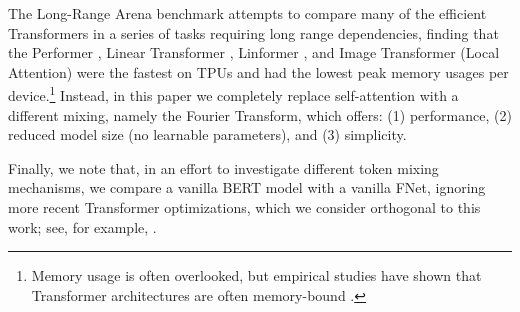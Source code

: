 The Long-Range Arena benchmark \citep{tay2020long} attempts to compare many of the efficient Transformers in a series of tasks requiring long range dependencies, finding that the Performer \citep{choromanski2020rethinking}, Linear Transformer \citep{katharopoulos2020transformers}, Linformer \citep{wang2020linformer}, and Image Transformer (Local Attention) \citep{parmar2018image} were the fastest on TPUs and had the lowest peak memory usages per device.\footnote{Memory usage is often overlooked, but empirical studies have shown that Transformer architectures are often memory-bound \citep{ivanov2020data, shazeer2019fast}.} Instead, in this paper we completely replace self-attention with a different mixing, namely the Fourier Transform, which offers: (1) performance,
(2) reduced model size (no learnable parameters), and (3) simplicity.

Finally, we note that, in an effort to investigate different token mixing mechanisms, we compare a vanilla BERT model \citep{devlin2018bert} with a vanilla FNet, ignoring more recent Transformer optimizations, which we consider orthogonal to this work; see, for example, \citep{narang2021transformer, kim2020fastformers, shleifer2020pre}.
